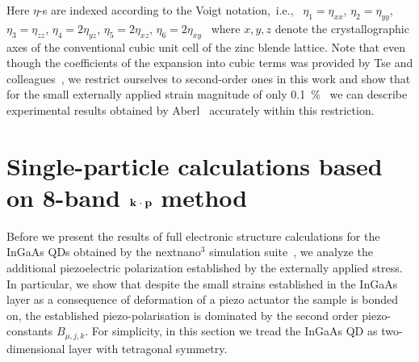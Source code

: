 %
%
Here $\eta$-s are indexed according to the Voigt notation,~i.e.,~ $\eta_1=\eta_{xx}$, $\eta_2=\eta_{yy}$, $\eta_3=\eta_{zz}$, $\eta_4=2\eta_{yz}$, $\eta_5=2\eta_{xz}$, $\eta_6=2\eta_{xy}$~\cite{Beya-Wakata2011} where $x,y,z$ denote the crystallographic axes of the conventional cubic unit cell of the zinc blende lattice.
%
%
Note that even though the coefficients of the expansion into cubic
terms was provided by Tse and colleagues~\cite{Tse2013}, we restrict ourselves to second-order ones in this work and show that for the small externally applied strain magnitude of only 0.1~\%~\cite{Aberl:17} we can describe experimental results obtained by Aberl~\cite{Aberl:17} accurately within this restriction. 


\section{Single-particle calculations based on 8-band $\bf{k \cdot p}$ method}




Before we present the results of full electronic structure calculations for the InGaAs QDs obtained by the nextnano$^3$ simulation suite~\cite{Birner:07}, we analyze the additional piezoelectric polarization established by the externally applied stress. In particular, we show that despite the small strains established in the InGaAs layer as a consequence of deformation of a piezo actuator the sample is bonded on, the established piezo-polarisation is dominated by the second order piezo-constants $B_{\mu,j,k}$. For simplicity, in this section we tread the InGaAs QD as two-dimensional layer with tetragonal symmetry.    


